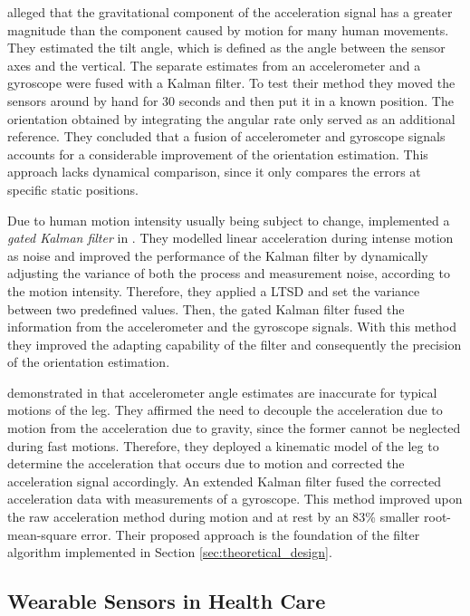 \citeauthor{Luinge_orientation_acc_gyro_99} \cite{Luinge_orientation_acc_gyro_99} alleged that the gravitational component of the acceleration signal has a greater magnitude than the component caused by motion for many human movements. They estimated the tilt angle, which is defined as the angle between the sensor axes and the vertical. The separate estimates from an accelerometer and a gyroscope were fused with a Kalman filter. To test their method they moved the sensors around by hand for 30 seconds and then put it in a known position. The orientation obtained by integrating the angular rate only served as an additional reference. They concluded that a fusion of accelerometer and gyroscope signals accounts for a considerable improvement of the orientation estimation. This approach lacks dynamical comparison, since it only compares the errors at specific static positions.

Due to human motion intensity usually being subject to change, \citeauthor{olivares_vicente_signal_2013} implemented a \emph{gated Kalman filter} in \cite{olivares_vicente_signal_2013}. They modelled linear acceleration during intense motion as noise and improved the performance of the Kalman filter by dynamically adjusting the variance of both the process and measurement noise, according to the motion intensity. Therefore, they applied a \gls{LTSD} and set the variance between two predefined values. Then, the gated Kalman filter fused the information from the accelerometer and the gyroscope signals. With this method they improved the adapting capability of the filter and consequently the precision of the orientation estimation.

\citeauthor{bennett_motion_2014} demonstrated in \cite{bennett_motion_2014} that accelerometer angle estimates are inaccurate for typical motions of the leg. They affirmed the need to decouple the acceleration due to motion from the acceleration due to gravity, since the former cannot be neglected during fast motions. Therefore, they deployed a kinematic model of the leg to determine the acceleration that occurs due to motion and corrected the acceleration signal accordingly. An extended Kalman filter fused the corrected acceleration data with measurements of a gyroscope. This method improved upon the raw acceleration method during motion and at rest by an 83\% smaller root-mean-square error. Their proposed approach is the foundation of the filter algorithm implemented in Section \ref{sec:theoretical_design}.

\subsection{Wearable Sensors in Health Care}\label{sec:MARG_sensors_medical}

